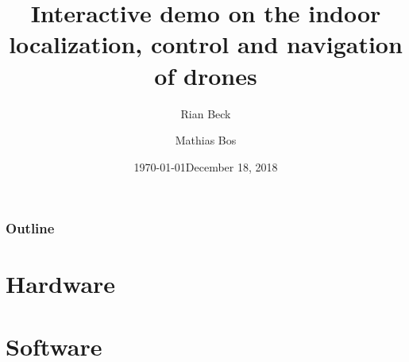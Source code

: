\documentclass{beamer}
\title[Thesis presentation halftime]{Interactive demo on the indoor localization, control and navigation of drones}
\author[Rian Beck \and Mathias Bos]{Rian Beck  \and Mathias Bos\\
\hspace{-2mm}\fs{r0585849 \hspace{0.9cm} r0582602}}
\date{\today}      %
\date[]{December 18, 2018} %
\begin{document}
\begin{frame}
	\titlepage
\end{frame}
\begin{frame}
\frametitle{Outline}
  \tableofcontents[hideallsubsections]
\end{frame}



\section{Hardware}



\section{Software}










\end{document}
